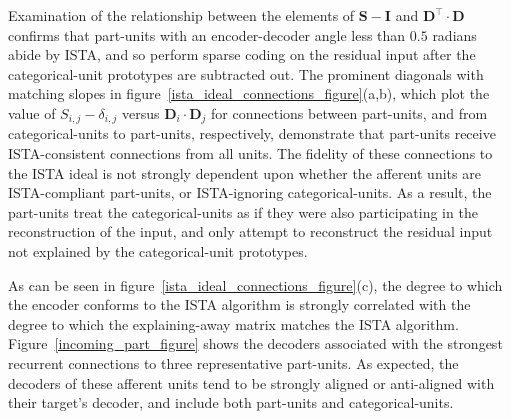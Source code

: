 \documentclass{article} %
\newcommand{\D}{\mathbf{D}}
\newcommand{\E}{\mathbf{E}}
\newcommand{\I}{\mathbf{I}}
\newcommand{\Sm}{\mathbf{S}}
\begin{document}
Examination of the relationship between the elements of $\Sm - \I$ and $\D^{\top} \cdot \D$ confirms that part-units with an encoder-decoder angle less than $0.5$ radians abide by ISTA, and so perform sparse coding on the residual input after the categorical-unit prototypes are subtracted out.  
The prominent diagonals with matching slopes in figure~\ref{ista_ideal_connections_figure}(a,b), which plot the value of $S_{i,j} - \delta_{i,j}$ versus $\D_i \cdot \D_j$ for connections between part-units, and from categorical-units to part-units, respectively, demonstrate that part-units receive ISTA-consistent connections from all units.  The fidelity of these connections to the ISTA ideal is not strongly dependent upon whether the afferent units are ISTA-compliant part-units, or ISTA-ignoring categorical-units.  As a result, the part-units treat the categorical-units as if they were also participating in the reconstruction of the input, and only attempt to reconstruct the residual input not explained by the categorical-unit prototypes.  

As can be seen in figure~\ref{ista_ideal_connections_figure}(c), the degree to which the encoder conforms to the ISTA algorithm is strongly correlated with the degree to which the explaining-away matrix matches the ISTA algorithm.  Figure~\ref{incoming_part_figure} shows the decoders associated with the strongest recurrent connections to three representative part-units.  As expected, the decoders of these afferent units tend to be strongly aligned or anti-aligned with their target's decoder, and include both part-units and categorical-units.
\end{document}
